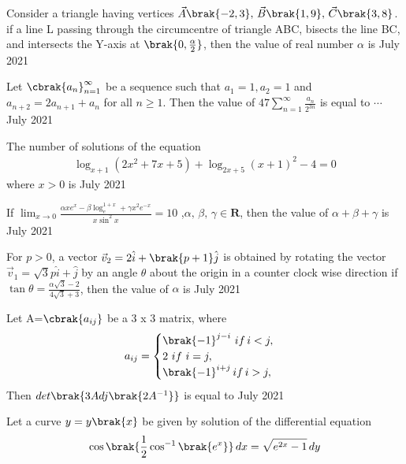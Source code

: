 \iffalse
  \title{Assignment}
  \author{EE24BTECH11038}
  \section{integer}
\fi  
\item Consider a triangle having vertices $\vec{A}\brak{-2,3},\,\vec{B}\brak{1,9},\,\vec{C}\brak{3,8}$. if a line L passing through the circumcentre of triangle ABC, bisects the line BC, and intersects the Y-axis at $\brak{0,\frac{\alpha}{2}}$, then the value of real number $\alpha$ is \hfill{July 2021}
\item Let $\cbrak{a_n}_{n=1}^{\infty}$ be a sequence such that $a_1=1,a_2=1$ and  $a_{n+2}=2a_{n+1}+a_{n}$ for all $n\geq 1$. Then the value of $47\sum_{n=1}^{\infty} \frac{a_n}{2^{3n}}$ is equal to $\cdots$ \hfill{July 2021}
\item The number of solutions of the equation 
\begin{align*}
    \log_{x+1}\left(2x^2+7x+5\right)+\log_{2x+5}\left({x+1}\right)^2-4=0
\end{align*} 
where $x>0$ is \hfill{July 2021}
\item If $\lim_{x\to 0} \frac{\alpha xe^x-\beta\log_{e}^{1+x}+\gamma x^2e^{-x}}{x\sin^2{x}}=10$ ,$\alpha,\,\beta,\,\gamma \in \mathbf{R}$, then the value of $\alpha+\beta+\gamma$ is \hfill{July 2021}
\item For $p>0$, a vector $\vec{v}_2=2\hat{i}+\brak{p+1}\hat{j}$ is obtained by rotating the vector $\vec{v}_1=\sqrt{3}p\hat{i}+\hat{j}$ by an angle $\theta$ about the origin in a counter clock wise direction if $\tan{\theta}=\frac{\alpha \sqrt{3}-2}{4\sqrt{3}+3}$, then the value of $\alpha$ is \hfill{July 2021}
\item Let A=$\cbrak{a_{ij}}$ be a 3 x 3 matrix, where 
\begin{align*}
    a_{ij}=
    \begin{cases}
        \brak{-1}^{j-i} \,\,if \,i<j, \\
        2 \,\, if \,\, i=j, \\
        \brak{-1}^{i+j} \,if\, i>j, 
    \end{cases}
\end{align*}
Then $det\brak{3Adj\brak{2A^{-1}}}$ is equal to  \hfill{July 2021}
\item Let a curve $y=y\brak{x}$ be given by solution of the differential equation 
\begin{align*}
    \cos{\brak{\frac{1}{2}\cos^{-1}{\brak{e^x}}}}\, dx=\sqrt{e^{2x}-1}\,dy
\end{align*}
